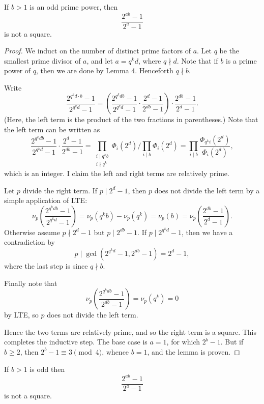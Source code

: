\begin{boxlemma}
    If $b>1$ is an odd prime power, then \[\frac{2^{ab}-1}{2^a-1}\]
    is not a square.
\end{boxlemma}
\begin{proof}
    We induct on the number of distinct prime factors of $a$. Let $q$ be the smallest prime divisor of $a$, and let $a=q^kd$, where $q\nmid d$. Note that if $b$ is a prime power of $q$, then we are done by Lemma 4. Henceforth $q\nmid b$.

    Write \[\frac{2^{q^kd\cdot b}-1}{2^{q^kd}-1}=\left(\frac{2^{q^kdb}-1}{2^{q^kd}-1}\cdot\frac{2^d-1}{2^{db}-1}\right)\cdot\frac{2^{db}-1}{2^d-1}.\]
    (Here, the left term is the product of the two fractions in parentheses.) Note that the left term can be written as \[\frac{2^{q^kdb}-1}{2^{q^kd}-1}\cdot\frac{2^d-1}{2^{db}-1}=\prod_{\substack{i\mid q^kb\\ i\nmid q^k}}\Phi_i(2^d)\bigg/\prod_{i\mid b}\Phi_i(2^d)=\prod_{i\mid b}\frac{\Phi_{q^ki}(2^d)}{\Phi_i(2^d)},\]
    which is an integer. I claim the left and right terms are relatively prime.

    Let $p$ divide the right term. If $p\mid2^d-1$, then $p$ does not divide the left term by a simple application of LTE: \[\nu_p\left(\frac{2^{q^kdb}-1}{2^{q^kd}-1}\right)=\nu_p\left(q^kb\right)-\nu_p\left(q^k\right)=\nu_p(b)=\nu_p\left(\frac{2^{db}-1}{2^d-1}\right).\]
    Otherwise assume $p\nmid2^d-1$ but $p\mid2^{db}-1$. If $p\mid2^{q^kd}-1$, then we have a contradiction by \[p\mid\gcd\left(2^{q^kd}-1,2^{db}-1\right)=2^d-1,\]
    where the last step is since $q\nmid b$.

    Finally note that \[\nu_p\left(\frac{2^{q^kdb}-1}{2^{db}-1}\right)=\nu_p\left(q^k\right)=0\]
    by LTE, so $p$ does not divide the left term.

    Hence the two terms are relatively prime, and so the right term is a square. This completes the inductive step. The base case is $a=1$, for which $2^b-1$. But if $b\ge2$, then $2^b-1\equiv3\pmod4$, whence $b=1$, and the lemma is proven.
\end{proof}
\begin{boxlemma}
    If $b>1$ is odd then \[\frac{2^{ab}-1}{2^a-1}\]
    is not a square.
\end{boxlemma}

